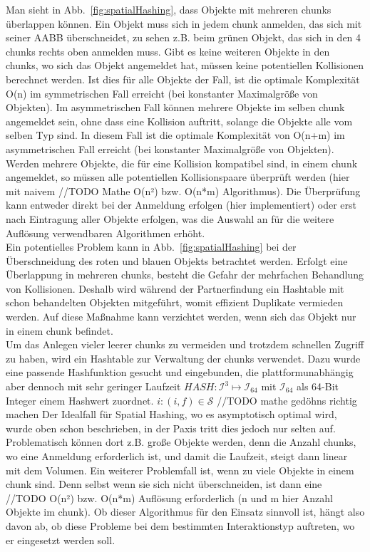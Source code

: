 Man sieht in Abb.~\ref{fig:spatialHashing}, dass Objekte mit mehreren chunks überlappen können. Ein Objekt muss sich in jedem chunk anmelden, das sich mit seiner AABB überschneidet, zu sehen z.B. beim grünen Objekt, das sich in den 4 chunks rechts oben anmelden muss. Gibt es keine weiteren Objekte in den chunks, wo sich das Objekt angemeldet hat, müssen keine potentiellen Kollisionen berechnet werden. Ist dies für alle Objekte der Fall, ist die optimale Komplexität O(n) im symmetrischen Fall erreicht (bei konstanter Maximalgröße von Objekten). Im asymmetrischen Fall können mehrere Objekte im selben chunk angemeldet sein, ohne dass eine Kollision auftritt, solange die Objekte alle vom selben Typ sind. In diesem Fall ist die optimale Komplexität von O(n+m) im asymmetrischen Fall erreicht (bei konstanter Maximalgröße von Objekten). \\
Werden mehrere Objekte, die für eine Kollision kompatibel sind, in einem chunk angemeldet, so müssen alle potentiellen Kollisionspaare überprüft werden (hier mit naivem //TODO Mathe O(n²) bzw. O(n*m) Algorithmus). Die Überprüfung kann entweder direkt bei der Anmeldung erfolgen (hier implementiert) oder erst nach Eintragung aller Objekte erfolgen, was die Auswahl an für die weitere Auflösung verwendbaren Algorithmen erhöht. \\
Ein potentielles Problem kann in Abb.~\ref{fig:spatialHashing} bei der Überschneidung des roten und blauen Objekts betrachtet werden. Erfolgt eine Überlappung in mehreren chunks, besteht die Gefahr der mehrfachen Behandlung von Kollisionen. Deshalb wird während der Partnerfindung ein Hashtable mit schon behandelten Objekten mitgeführt, womit effizient Duplikate vermieden werden. Auf diese Maßnahme kann verzichtet werden, wenn sich das Objekt nur in einem chunk befindet.\\
Um das Anlegen vieler leerer chunks zu vermeiden und trotzdem schnellen Zugriff zu haben, wird ein Hashtable zur Verwaltung der chunks verwendet. Dazu wurde eine passende Hashfunktion gesucht und eingebunden, die plattformunabhängig aber dennoch mit sehr geringer Laufzeit $HASH: \mathcal{I}^3 \mapsto \mathcal{I}_{64}$ mit $\mathcal{I}_{64}$ als 64-Bit Integer einem Hashwert zuordnet. $i: (i, f)\in\mathcal{S}$
//TODO mathe gedöhns richtig machen
Der Idealfall für Spatial Hashing, wo es asymptotisch optimal wird, wurde oben schon beschrieben, in der Paxis tritt dies jedoch nur selten auf. Problematisch können dort z.B. große Objekte werden, denn die Anzahl chunks, wo eine Anmeldung erforderlich ist, und damit die Laufzeit, steigt dann linear mit dem Volumen. Ein weiterer Problemfall ist, wenn zu viele Objekte in einem chunk sind. Denn selbst wenn sie sich nicht überschneiden, ist dann eine //TODO O(n²) bzw. O(n*m) Auflösung erforderlich (n und m hier Anzahl Objekte im chunk). Ob dieser Algorithmus für den Einsatz sinnvoll ist, hängt also davon ab, ob diese Probleme bei dem bestimmten Interaktionstyp auftreten, wo er eingesetzt werden soll. \\
